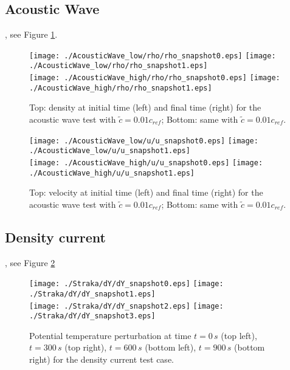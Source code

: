 \documentclass{ametsoc}
\theoremstyle{definition}
\begin{document}
\cite{KadiogluEtAl2008}

\subsection{Acoustic Wave}

\cite{Benacchio2014}, see Figure \ref{fig:acouwave}.

\begin{figure}
 \texttt{[image: ./AcousticWave\_low/rho/rho\_snapshot0.eps]}
 \texttt{[image: ./AcousticWave\_low/rho/rho\_snapshot1.eps]}\\
\texttt{[image: ./AcousticWave\_high/rho/rho\_snapshot0.eps]}
 \texttt{[image: ./AcousticWave\_high/rho/rho\_snapshot1.eps]}
 \caption{Top: density at initial time (left) and final time (right) for the acoustic wave test with $\tilde{c}=0.01c_{ref}$; Bottom: same with $\tilde{c}=0.01c_{ref}$.}
\end{figure}

\begin{figure}
 \texttt{[image: ./AcousticWave\_low/u/u\_snapshot0.eps]}
 \texttt{[image: ./AcousticWave\_low/u/u\_snapshot1.eps]}\\
 \texttt{[image: ./AcousticWave\_high/u/u\_snapshot0.eps]}
 \texttt{[image: ./AcousticWave\_high/u/u\_snapshot1.eps]}
 \caption{Top: velocity at initial time (left) and final time (right) for the acoustic wave test with $\tilde{c}=0.01c_{ref}$; Bottom: same with $\tilde{c}=0.01c_{ref}$.}
  \label{fig:acouwave}
\end{figure}

\subsection{Density current}

\cite{StrakaEtAl1993}, see Figure \ref{fig:straka}

\begin{figure}
 \texttt{[image: ./Straka/dY/dY\_snapshot0.eps]}
 \texttt{[image: ./Straka/dY/dY\_snapshot1.eps]}\\
 \texttt{[image: ./Straka/dY/dY\_snapshot2.eps]}
 \texttt{[image: ./Straka/dY/dY\_snapshot3.eps]}
 \caption{Potential temperature perturbation at time $t=0\, s$ (top left), $t=300\, s$ (top right), $t=600\, s$ (bottom left), $t=900\, s$ (bottom right) for the density current test case.}
 \label{fig:straka}
\end{figure}
\end{document}
